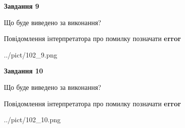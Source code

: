 \documentclass[12pt, ukrainian]{article}
\begin{document}
{{\begin {center}\textbf{Завдання 9}\end {center}}\par
Що буде виведено за виконання? \par
Повідомлення інтерпретатора про помилку позначати \textbf{error}

\begin{center}
	{../pict/102_9.png}
\end{center}
\newpage

{\begin {center}\textbf{Завдання 10}\end {center}}\par
Що буде виведено за виконання? \par
Повідомлення інтерпретатора про помилку позначати \textbf{error}

\begin{center}
	{../pict/102_10.png}
\end{center}
\newpage

}
\end{document}
